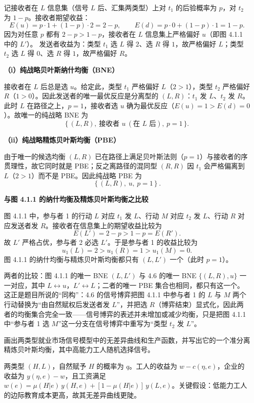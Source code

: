 记接收者在 $L$ 信息集（信号 $L$ 后、汇集两类型）上对 $t_1$ 的后验概率为 $p$，对 $t_2$ 为 $1-p$。接收者期望收益：
\[
  E(u)=p\cdot 1+(1-p)\cdot 2=2-p,\qquad E(d)=p\cdot 0+(1-p)\cdot 1=1-p .
\]\indent
因为对任意 $p$ 都有 $2-p>1-p$，接收者在 $L$ 信息集上严格偏好 $u$（即图 4.1.1 中的 $L'$）。
发送者收益为：类型 $t_1$ 选 $L$ 得 $2$、选 $R$ 得 $1$，故严格偏好 $L$；类型 $t_2$ 选 $L$ 得 $0$、选 $R$ 得 $1$，故严格偏好 $R$。

\noindent\textbf{（i）纯战略贝叶斯纳什均衡（BNE）}

接收者在 $L$ 后总是选 $u$。给定此，类型 $t_1$ 严格偏好 $L$（$2>1$），类型 $t_2$ 严格偏好 $R$（$1>0$）。因此发送者的唯一最优反应是分离型的 $(L,R)$：$t_1$ 发 $L$、$t_2$ 发 $R$。此时 $L$ 在路径之上，$p=1$，接收者选 $u$ 确为最优反应（$E(u)=1>E(d)=0$）。故唯一的纯战略 BNE 为
\[
  \bigl\{\,(L,R),\ \text{接收者 }u\ (\text{在 }L\text{ 后}),\ p=1\,\bigr\}.
\]

\noindent\textbf{（ii）纯战略精炼贝叶斯均衡（PBE）}

由于唯一的候选均衡 $(L,R)$ 已在路径上满足贝叶斯法则（$p=1$）与接收者的序贯理性，故它同时就是 PBE；反之离路径的混同型 $(R,R)$ 因 $t_1$ 会严格偏离到 $L$（$2>1$）而不是 PBE。因此纯战略 PBE 为
\[
  \boxed{\ \bigl\{\,(L,R),\ u,\ p=1\,\bigr\}\ } .
\]

\noindent\textbf{与图 4.1.1 的纳什均衡及精炼贝叶斯均衡之比较}

图 4.1.1 中，参与者 1 的行动 $L$ 对应 $t_1$ 发 $L$、行动 $M$ 对应 $t_2$ 发 $L$、行动 $R$ 对应发送者发 $R$。接收者在信息集上的期望收益比较为
\[
  E(L')=2-p>1-p=E(R').
\]
\indent 故 $L'$ 严格占优，参与者 2 必选 $L'$。于是参与者 1 的收益比较为
\[
  u_1(L)=2>u_1(R)=1>u_1(M)=0.
\]
\indent 图 4.1.1 的纳什均衡与精炼贝叶斯均衡都只有 $(L,L')$ 一个（此时 $p=1$）。

两者的比较：图 4.1.1 的唯一 BNE $(L,L')$ 与 4.6 的唯一 BNE $\{(L,R),u\}$ 一一对应，其中 $L\leftrightarrow u$，$L'\leftrightarrow L$；二者的唯一 PBE 集合也相同，都只有这一个。这正是题目所说的“同构”：4.6 的信号博弈把图 4.1.1 中参与者 1 的 $L$ 与 $M$ 两个行动替换为“由自然赋权后发送者发 $L$”，并把选 $R$（博弈结束）显式化，因此两者的均衡集合完全一致——信号博弈的表述并未增加或减少均衡，只是把图 4.1.1 中“参与者 1 选 $M$”这一分支在信号博弈中重写为“类型 $t_2$ 发 $L$”。

画出两类型就业市场信号模型中的无差异曲线和生产函数，并写出它的一个准分离精炼贝叶斯均衡，其中高能力工人随机选择信号。

\sol 两类型 $(H,L)$，自然赋予 $H$ 的概率为 $q$。工人的收益为 $w-c(\eta,e)$，企业的收益为 $y(\eta,e)-w$，且工资满足 $w(e)=\mu(H|e)\,y(H,e)+[1-\mu(H|e)]\,y(L,e)$。关键假设：低能力工人的边际教育成本更高，故其无差异曲线更陡。

